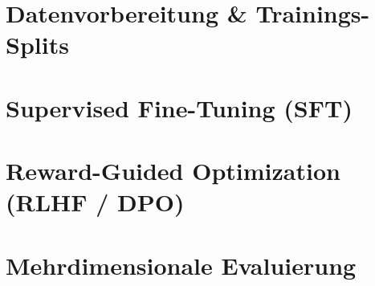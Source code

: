 \section{Datenvorbereitung \& Trainings-Splits}

\section{Supervised Fine-Tuning (SFT)}

\section{Reward-Guided Optimization (RLHF / DPO)}

\section{Mehrdimensionale Evaluierung}
